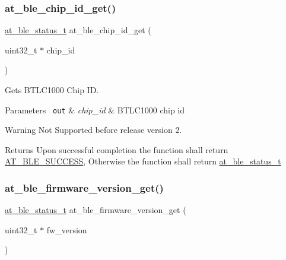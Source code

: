 \subsubsection{\texorpdfstring{at\_ble\_chip\_id\_get()}{at\_ble\_chip\_id\_get()}}
{\footnotesize\ttfamily \mbox{\hyperlink{group__error__codes__group_ga3b1db9b95feb157b3c188ca27fe76988}{at\+\_\+ble\+\_\+status\+\_\+t}} at\+\_\+ble\+\_\+chip\+\_\+id\+\_\+get (\begin{DoxyParamCaption}\item[{uint32\+\_\+t $\ast$}]{chip\+\_\+id }\end{DoxyParamCaption})}



Gets B\+T\+L\+C1000 Chip ID. 


\begin{DoxyParams}[1]{Parameters}
\mbox{\texttt{ out}}  & {\em chip\+\_\+id} & B\+T\+L\+C1000 chip id\\
\hline
\end{DoxyParams}
\begin{DoxyWarning}{Warning}
Not Supported before release version 2.
\end{DoxyWarning}
\begin{DoxyReturn}{Returns}
Upon successful completion the function shall return \mbox{\hyperlink{group__error__codes__group_gga3b1db9b95feb157b3c188ca27fe76988a7e3bfff5387331cd4f2c56cbcbbd7e19}{A\+T\+\_\+\+B\+L\+E\+\_\+\+S\+U\+C\+C\+E\+SS}}, Otherwise the function shall return \mbox{\hyperlink{at__ble__api_8h_ace24eb4e5ca3f325c663b809da5feb92}{at\+\_\+ble\+\_\+status\+\_\+t}} 
\end{DoxyReturn}
\mbox{\label{group__gap__misc__group_ga2ad880a04d258b285c8a53a0d6008abb}} 
\subsubsection{\texorpdfstring{at\_ble\_firmware\_version\_get()}{at\_ble\_firmware\_version\_get()}}
{\footnotesize\ttfamily \mbox{\hyperlink{group__error__codes__group_ga3b1db9b95feb157b3c188ca27fe76988}{at\+\_\+ble\+\_\+status\+\_\+t}} at\+\_\+ble\+\_\+firmware\+\_\+version\+\_\+get (\begin{DoxyParamCaption}\item[{uint32\+\_\+t $\ast$}]{fw\+\_\+version }\end{DoxyParamCaption})}



